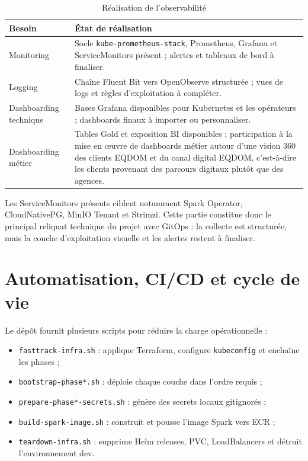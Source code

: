 \begin{table}[H]
\centering
\caption{Réalisation de l'observabilité}
\label{tab:observabilite-realisation}
\small
\begin{tabular}{@{}p{}p{}@{}}
\toprule
\textbf{Besoin} & \textbf{État de réalisation} \\
\midrule
Monitoring & Socle \texttt{kube-prometheus-stack}, Prometheus, Grafana et ServiceMonitors présent ; alertes et tableaux de bord à finaliser. \\
Logging & Chaîne Fluent Bit vers OpenObserve structurée ; vues de logs et règles d'exploitation à compléter. \\
Dashboarding technique & Bases Grafana disponibles pour Kubernetes et les opérateurs ; dashboards finaux à importer ou personnaliser. \\
Dashboarding métier & Tables Gold et exposition BI disponibles ; participation à la mise en œuvre de dashboards métier autour d'une vision 360 des clients EQDOM et du canal digital EQDOM, c'est-à-dire les clients provenant des parcours digitaux plutôt que des agences. \\
\bottomrule
\end{tabular}
\end{table}

Les ServiceMonitors présents ciblent notamment Spark Operator, CloudNativePG, MinIO Tenant et Strimzi. Cette partie constitue donc le principal reliquat technique du projet avec GitOps : la collecte est structurée, mais la couche d'exploitation visuelle et les alertes restent à finaliser.

\section{Automatisation, CI/CD et cycle de vie}

Le dépôt fournit plusieurs scripts pour réduire la charge opérationnelle :
\begin{itemize}
    \item \texttt{fasttrack-infra.sh} : applique Terraform, configure \texttt{kubeconfig} et enchaîne les phases ;
    \item \texttt{bootstrap-phase*.sh} : déploie chaque couche dans l'ordre requis ;
    \item \texttt{prepare-phase*-secrets.sh} : génère des secrets locaux gitignorés ;
    \item \texttt{build-spark-image.sh} : construit et pousse l'image Spark vers ECR ;
    \item \texttt{teardown-infra.sh} : supprime Helm releases, PVC, LoadBalancers et détruit l'environnement dev.
\end{itemize}

